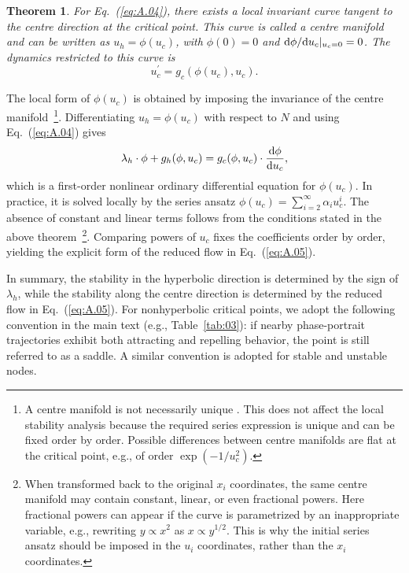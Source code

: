 \documentclass[aps,prd,twocolumn]{revtex4-2}
\newtheorem{theorem}{Theorem}
\newcommand\dx{{\rm d}}
\begin{document}
\begin{theorem}
  For Eq.~(\ref{eq:A.04}), there exists a local invariant curve tangent to the centre direction at the critical point. This curve is called a centre manifold and can be written as $u_h=\phi(u_c)$, with $\phi(0)=0$ and $\dx\phi/\dx u_c|_{u_c=0}=0$. The dynamics restricted to this curve is
  \begin{equation}\label{eq:A.05}
    u_c^\prime = g_c(\phi(u_c),u_c).
  \end{equation}
\end{theorem}
The local form of $\phi(u_c)$ is obtained by imposing the invariance of the centre manifold~\footnote{A centre manifold is not necessarily unique \cite{Meiss2007.book}. This does not affect the local stability analysis because the required series expression is unique and can be fixed order by order. Possible differences between centre manifolds are flat at the critical point, e.g., of order $\exp(-1/u_c^{2})$.}. Differentiating $u_h=\phi(u_c)$ with respect to $N$ and using Eq.~(\ref{eq:A.04}) gives
\begin{equation}\label{eq:A.06}
  \lambda_h\cdot\phi + g_h(\phi,u_c) = g_c(\phi,u_c)\cdot\frac{\dx\phi}{\dx u_c},
\end{equation}
which is a first-order nonlinear ordinary differential equation for $\phi(u_c)$. In practice, it is solved locally by the series ansatz $\phi(u_c) = \sum_{i=2}^{\infty} \alpha_i u_c^i$. The absence of constant and linear terms follows from the conditions stated in the above theorem~\footnote{When transformed back to the original $x_i$ coordinates, the same centre manifold may contain constant, linear, or even fractional powers. Here fractional powers can appear if the curve is parametrized by an inappropriate variable, e.g., rewriting $y\propto x^2$ as $x\propto y^{1/2}$. This is why the initial series ansatz should be imposed in the $u_i$ coordinates, rather than the $x_i$ coordinates.}. Comparing powers of $u_c$ fixes the coefficients order by order, yielding the explicit form of the reduced flow in Eq.~(\ref{eq:A.05}).

In summary, the stability in the hyperbolic direction is determined by the sign of $\lambda_h$, while the stability along the centre direction is determined by the reduced flow in Eq.~(\ref{eq:A.05}). For nonhyperbolic critical points, we adopt the following convention in the main text (e.g., Table~\ref{tab:03}): if nearby phase-portrait trajectories exhibit both attracting and repelling behavior, the point is still referred to as a saddle. A similar convention is adopted for stable and unstable nodes.
\end{document}
